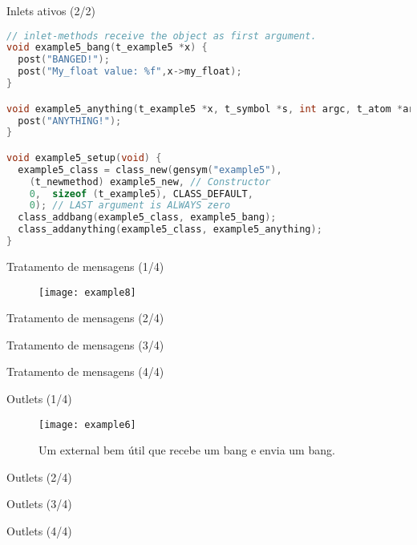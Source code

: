 \begin{frame}[fragile]{Inlets ativos (2/2)}
\begin{lstlisting}[language=C]
// inlet-methods receive the object as first argument.
void example5_bang(t_example5 *x) { 
  post("BANGED!");
  post("My_float value: %f",x->my_float);
}

void example5_anything(t_example5 *x, t_symbol *s, int argc, t_atom *argv){
  post("ANYTHING!");
}

void example5_setup(void) {
  example5_class = class_new(gensym("example5"),
    (t_newmethod) example5_new, // Constructor
    0,  sizeof (t_example5), CLASS_DEFAULT,
    0); // LAST argument is ALWAYS zero
  class_addbang(example5_class, example5_bang);
  class_addanything(example5_class, example5_anything);
}
\end{lstlisting}
\end{frame}

\begin{frame}{Tratamento de mensagens (1/4)}
\begin{figure}[h!]
\centering
\texttt{[image: example8]}
\label{fig:inlet-ativo}
\end{figure}
\end{frame}

\begin{frame}[fragile]{Tratamento de mensagens (2/4)}

\end{frame}


\begin{frame}[fragile]{Tratamento de mensagens (3/4)}

\end{frame}


\begin{frame}[fragile]{Tratamento de mensagens (4/4)}

\end{frame}


\begin{frame}{Outlets (1/4)}
\begin{figure}[h!]
\centering
\texttt{[image: example6]}
\caption{Um external bem útil que recebe um bang e envia um bang.}
\label{fig:outlet-bang}
\end{figure}
\end{frame}


\begin{frame}{Outlets (2/4)}

\end{frame}


\begin{frame}{Outlets (3/4)}

\end{frame}


\begin{frame}{Outlets (4/4)}

\end{frame}

